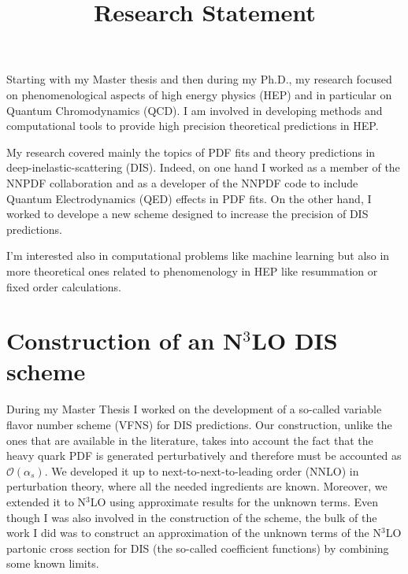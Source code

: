 \documentclass[11pt,a4paper]{moderncv}        %
\title{Research Statement}
\begin{document}
\makecvtitle

Starting with my Master thesis and then during my Ph.D., my research focused on phenomenological aspects of high energy physics (HEP)
and in particular on Quantum Chromodynamics (QCD).
I am involved in developing methods and computational tools to provide high precision theoretical predictions in HEP.


My research covered mainly the topics of PDF fits and theory predictions in deep-inelastic-scattering (DIS).
Indeed, on one hand I worked as a member of the NNPDF collaboration and as a developer of the NNPDF code to include
Quantum Electrodynamics (QED) effects in PDF fits.
On the other hand, I worked to develope a new scheme designed to increase the precision of DIS predictions.

I'm interested also in computational problems like machine learning but also in more theoretical ones related to phenomenology in 
HEP like resummation or fixed order calculations.

\section{Construction of an N$^3$LO DIS scheme}

During my Master Thesis I worked on the development of a so-called variable flavor number scheme (VFNS) 
for DIS predictions.
%
%
Our construction, unlike the ones that are available in the literature, takes into account the fact that the heavy quark PDF is generated
perturbatively and therefore must be accounted as $\mathcal{O}(\alpha_s)$.
%
We developed it up to next-to-next-to-leading order (NNLO) in perturbation theory, where all the needed ingredients are known.
Moreover, we extended it to N$^3$LO using approximate results for the unknown terms.
Even though I was also involved in the construction of the scheme, the bulk of the work I did was to
construct an approximation of the unknown terms of the N$^3$LO partonic cross section for DIS (the so-called coefficient functions) by
combining some known limits.
\end{document}
